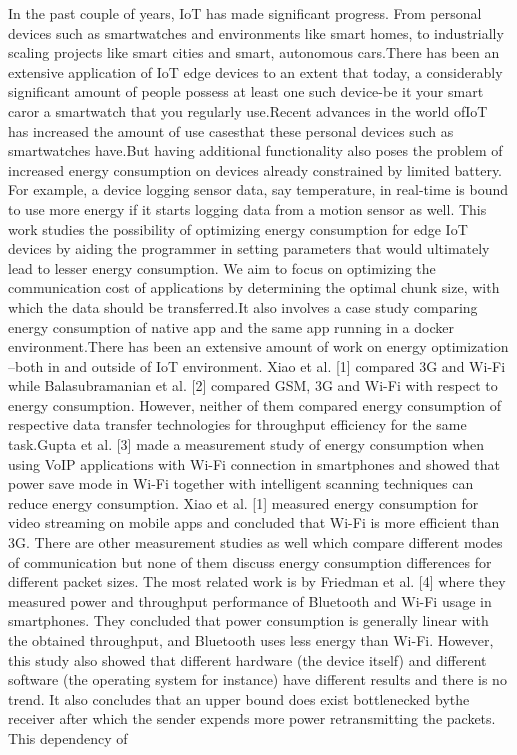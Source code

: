 In the past couple of years, IoT has made significant progress. From personal devices  such  as  smartwatches  and  environments  like  smart  homes,  to  industrially scaling  projects  like  smart  cities  and  smart,  autonomous  cars.There  has  been  an extensive  application  of  IoT  edge  devices  to  an  extent  that  today,  a  considerably significant amount of people possess at least one such device-be it your smart caror a smartwatch that you regularly use.Recent advances in the world ofIoT has increased the amount of use casesthat  these  personal  devices  such  as  smartwatches  have.But  having  additional functionality  also  poses  the  problem  of  increased  energy  consumption  on  devices already constrained by limited battery. For example, a device logging sensor data, say  temperature,  in  real-time  is  bound  to  use  more  energy  if  it  starts  logging  data from a motion sensor as well. This work studies the possibility of optimizing energy consumption for edge IoT devices by aiding the programmer in setting parameters that would ultimately lead   to   lesser   energy   consumption.   We   aim   to   focus   on   optimizing   the communication  cost  of  applications  by  determining  the  optimal  chunk  size,  with which the data should be transferred.It also involves a case study comparing energy consumption of native app and the same app running in a docker environment.There has been an extensive amount of work on energy optimization –both in  and  outside  of  IoT  environment.  Xiao  et  al.  [1]  compared  3G  and  Wi-Fi  while Balasubramanian  et  al.  [2]  compared  GSM,  3G  and  Wi-Fi  with  respect  to  energy consumption. However, neither of them compared energy consumption of respective data transfer technologies for throughput efficiency for the same task.Gupta et al. [3] made a measurement study of energy consumption when using VoIP  applications  with  Wi-Fi  connection  in  smartphones  and  showed  that  power save mode in Wi-Fi together with intelligent scanning techniques can reduce energy consumption. Xiao et al. [1] measured energy consumption for video streaming on mobile  apps  and  concluded  that  Wi-Fi  is  more  efficient  than  3G.  There  are  other measurement studies as well which compare different modes of communication but none of them discuss energy consumption differences for different packet sizes. The most related work is by Friedman et al. [4] where they measured power and throughput performance of Bluetooth and Wi-Fi usage in smartphones. They concluded that power consumption is generally linear with the obtained throughput, and Bluetooth uses less energy than Wi-Fi. However, this study also showed that different hardware (the device itself) and different software (the operating system for instance) have different results and there is no trend. It also concludes that an upper bound does exist bottlenecked bythe receiver after which the sender expends more power retransmitting the packets. This dependency of 
